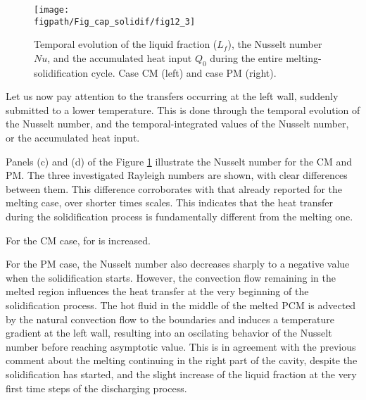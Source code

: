 \begin{figure}[!h]
\begin{center}
\begin{minipage}[t]{0.7\textwidth}
	\texttt{[image: \\figpath/Fig\_cap\_solidif/fig12\_3]}
\end{minipage}
\end{center}
\caption{Temporal evolution of the  liquid fraction ($L_f$), the Nusselt number $N\!u$, and the accumulated heat input $Q_0$ during the entire melting-solidification cycle. Case CM  (left) and  case PM  (right).}\label{fig:Lf_full_1D_profil}
\end{figure}

Let us now pay attention to the transfers occurring at the left wall, suddenly submitted to a lower temperature. This is done through the temporal evolution of the Nusselt number,  and the temporal-integrated values of the Nusselt number, or the accumulated heat input.     

Panels (c) and (d) of the Figure \ref{fig:Lf_full_1D_profil} illustrate the Nusselt number for the CM and PM.  
The three investigated Rayleigh numbers are shown, with clear differences between them. This difference corroborates with that already reported for the melting case, over shorter times scales.   This indicates that the heat transfer during the solidification process is fundamentally different from the melting one.

For the CM case, for   is increased.

For the PM case, the Nusselt number also decreases sharply to a negative value when the solidification starts.
However, the convection flow remaining in the melted region influences the heat transfer at the very beginning of the solidification process.
The hot fluid in the middle of the melted PCM is advected by the natural convection flow to the boundaries and induces a temperature gradient at the left wall, resulting into an oscilating behavior of the Nusselt number before reaching asymptotic value.
This is in agreement with the previous comment about the melting continuing in the right part of the cavity, despite the solidification has started, and the slight increase of the liquid fraction at the very first time steps of the discharging process.


